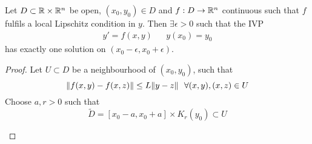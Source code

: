 \documentclass[../../script.tex]{subfiles}
\begin{document}
\begin{thm}
    Let $D \subset \mathbb{R} \times \mathbb{R}^n$ be open, $(x_0, y_0) \in D$ and $f: D \rightarrow \mathbb{R}^n$ continuous such that $f$ fulfils a local Lipschitz condition in $y$.
    Then $\exists \epsilon > 0$ such that the IVP 
    \begin{align*}
        y' = f(x, y) && y(x_0) = y_0
    \end{align*}
    has exactly one solution on $(x_0 - \epsilon, x_0 + \epsilon)$.
\end{thm}
\begin{proof}
    Let $U \subset D$ be a neighbourhood of $(x_0, y_0)$, such that 
    \begin{equation}
        \norm{f(x, y) - f(x, z)} \le L \norm{y - z} ~~\forall (x, y), (x, z) \in U
    \end{equation}
    Choose $a, r > 0$ such that 
    \begin{equation}
        \tilde{D} = [x_0 - a, x_0 + a] \times K_r(y_0) \subset U
    \end{equation}

    \begin{center}
\end{center}
\end{proof}
\end{document}
